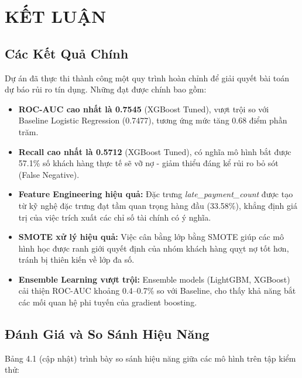 \chapter{KẾT LUẬN}

\section{Các Kết Quả Chính}

Dự án đã thực thi thành công một quy trình hoàn chỉnh để giải quyết bài toán dự báo rủi ro tín dụng. Những đạt được chính bao gồm:

\begin{itemize}

    \item \textbf{ROC-AUC cao nhất là 0.7545} (XGBoost Tuned), vượt trội so với Baseline Logistic Regression (0.7477), tương ứng mức tăng 0.68 điểm phần trăm.

    \item \textbf{Recall cao nhất là 0.5712} (XGBoost Tuned), có nghĩa mô hình bắt được 57.1\% số khách hàng thực tế sẽ vỡ nợ - giảm thiểu đáng kể rủi ro bỏ sót (False Negative).

    \item \textbf{Feature Engineering hiệu quả:} Đặc trưng \textit{late\_payment\_count} được tạo từ kỹ nghệ đặc trưng đạt tầm quan trọng hàng đầu (33.58\%), khẳng định giá trị của việc trích xuất các chỉ số tài chính có ý nghĩa.

    \item \textbf{SMOTE xử lý hiệu quả:} Việc cân bằng lớp bằng SMOTE giúp các mô hình học được ranh giới quyết định của nhóm khách hàng quỵt nợ tốt hơn, tránh bị thiên kiến về lớp đa số.
    
    \item \textbf{Ensemble Learning vượt trội:} Ensemble models (LightGBM, XGBoost) cải thiện ROC-AUC khoảng 0.4--0.7\% so với Baseline, cho thấy khả năng bắt các mối quan hệ phi tuyến của gradient boosting.

\end{itemize}

\section{Đánh Giá và So Sánh Hiệu Năng}

Bảng 4.1 (cập nhật) trình bày so sánh hiệu năng giữa các mô hình trên tập kiểm thử:

